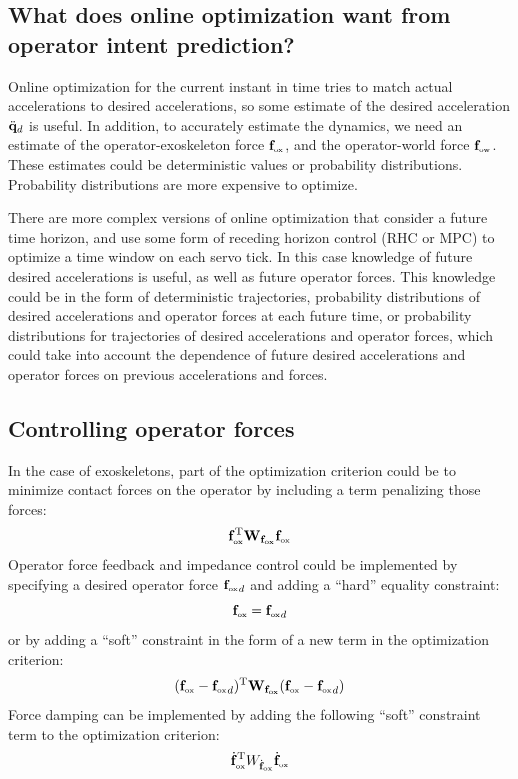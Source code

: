 \documentclass[letterpaper,12pt,fullpage]{article}
\newcommand{\ox}{{\mbox {\tiny ox}}}
\newcommand{\ow}{{\mbox {\tiny ow}}}
\begin{document}
\subsection{What does online optimization want from operator intent prediction?}
\label{sec:predict}

Online optimization for the current instant in time tries to match
actual accelerations to desired accelerations, so some estimate of the desired
acceleration $\ddot{{\bf q}}_d$ is useful. In addition, to accurately estimate the dynamics,
we need an estimate of the operator-exoskeleton force $\vf_{\ox}$, and the 
operator-world force $\vf_{\ow}$. These estimates could be deterministic values
or probability distributions. Probability distributions are more expensive to
optimize.

There are more complex versions of online optimization that consider a future
time horizon, and use some form of receding horizon control (RHC or MPC) to
optimize a time window on each servo tick. In this case knowledge of
future desired accelerations is useful, as well as future operator forces.
This knowledge could be in the form of deterministic trajectories, 
probability distributions of desired accelerations and operator 
forces at each future time,
or probability distributions for trajectories of desired accelerations and
operator forces,
which could take into account the dependence of future desired accelerations and 
operator forces
on previous accelerations and forces. 

\subsection{Controlling operator forces}

In the case of exoskeletons, 
part of the optimization criterion could be to
minimize contact forces on the operator by including a term penalizing those forces:
\begin{equation}
\vf^{\tr}_{\ox} \mW_{\vf_{\ox}} \vf_{\ox}
\end{equation}
Operator force feedback and impedance control could be implemented by specifying a
desired operator force ${\vf_{\ox}}_d$ and adding a ``hard'' equality constraint:
\begin{equation}
\vf_{\ox} = {\vf_{\ox}}_d
\end{equation}
or by adding a ``soft'' constraint in the form of a new term in the optimization
criterion:
\begin{equation}
(\vf_{\ox} - {\vf_{\ox}}_d)^{\tr} \mW_{\vf_{\ox}} (\vf_{\ox} - {\vf_{\ox}}_d)
\end{equation}
Force damping can be implemented by adding the following ``soft'' constraint term
to the optimization criterion:
\begin{equation}
\dot{\vf}_{\ox}^{\tr} W_{\dot{\vf}_{\ox}} \dot{\vf}_{\ox}
\end{equation}
\end{document}

